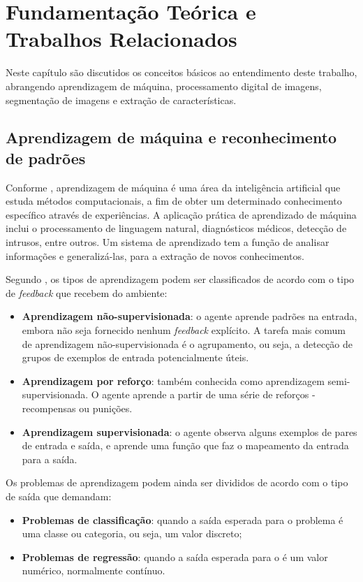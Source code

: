 \chapter{Fundamentação Teórica e Trabalhos Relacionados}

Neste capítulo são discutidos os conceitos básicos ao entendimento deste trabalho, abrangendo aprendizagem de máquina, processamento digital de imagens, segmentação de imagens e extração de características.

\section{Aprendizagem de máquina e reconhecimento de padrões}

Conforme , aprendizagem de máquina é uma área da inteligência artificial que estuda métodos computacionais, a fim de obter um determinado conhecimento específico através de experiências. A aplicação prática de aprendizado de máquina inclui o processamento de linguagem natural, diagnósticos médicos, detecção de intrusos, entre outros. Um sistema de aprendizado tem a função de analisar informações e generalizá-las, para a extração de novos conhecimentos.

Segundo , os tipos de aprendizagem podem ser classificados de acordo com o tipo de \textit{feedback} que recebem do ambiente:

\begin{itemize}
    \item \textbf{Aprendizagem não-supervisionada}: o agente aprende padrões na entrada, embora não seja fornecido nenhum \textit{feedback} explícito. A tarefa mais comum de aprendizagem não-supervisionada é o agrupamento, ou seja, a detecção de grupos de exemplos de entrada potencialmente úteis.
    \item \textbf{Aprendizagem por reforço}: também conhecida como aprendizagem semi-supervisionada. O agente aprende a partir de uma série de reforços - recompensas ou punições.
    \item \textbf{Aprendizagem supervisionada}: o agente observa alguns exemplos de pares de entrada e saída, e aprende uma função que faz o mapeamento da entrada para a saída. 
\end{itemize}

Os problemas de aprendizagem podem ainda ser divididos de acordo com o tipo de saída que demandam:

\begin{itemize}
	\item \textbf{Problemas de classificação}: quando a saída esperada para o problema é uma classe ou categoria, ou seja, um valor discreto;
	\item \textbf{Problemas de regressão}: quando a saída esperada para o é um valor numérico, normalmente contínuo.
\end{itemize}

